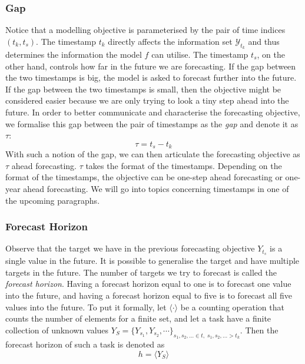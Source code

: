 \subsubsection{Gap}
Notice that a modelling objective is parameterised by the pair of time indices $(t_k, t_s)$. The timestamp $t_k$ directly affects the information set $\mathcal{Y}_{t_k}$ and thus determines the information the model $f$ can utilise. The timestamp $t_s$, on the other hand, controls how far in the future we are forecasting. If the gap between the two timestamps is big, the model is asked to forecast further into the future. If the gap between the two timestamps is small, then the objective might be considered easier because we are only trying to look a tiny step ahead into the future. In order to better communicate and characterise the forecasting objective, we formalise this gap between the pair of timestamps as the \textit{gap} and denote it as $\tau$:
\begin{equation*}
    \tau = t_s - t_k
\end{equation*}
With such a notion of the gap, we can then articulate the forecasting objective as $\tau$ ahead forecasting. $\tau$ takes the format of the timestamps. Depending on the format of the timestamps, the objective can be one-step ahead forecasting or one-year ahead forecasting. We will go into topics concerning timestamps in one of the upcoming paragraphs.

\subsubsection{Forecast Horizon}
Observe that the target we have in the previous forecasting objective $Y_{t_s}$ is a single value in the future. It is possible to generalise the target and have multiple targets in the future. The number of targets we try to forecast is called the \textit{forecast horizon}. Having a forecast horizon equal to one is to forecast one value into the future, and having a forecast horizon equal to five is to forecast all five values into the future. To put it formally, let $\langle \cdot \rangle$ be a counting operation that counts the number of elements for a finite set, and let a task have a finite collection of unknown values $Y_S = \{ Y_{s_1}, Y_{s_2}, \cdots \}_{s_1, s_2, \ldots \in t, \; s_1, s_2, \ldots > t_k}$. Then the forecast horizon of such a task is denoted as
\begin{equation*}
    h = \langle Y_S \rangle
\end{equation*}

